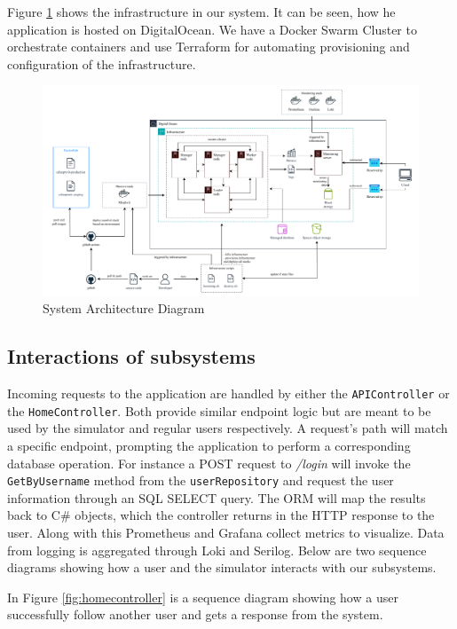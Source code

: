 Figure \ref{fig:architecture} shows the infrastructure in our system.
It can be seen, how he application is hosted on DigitalOcean. We have a Docker Swarm Cluster to orchestrate containers and use Terraform for automating provisioning and configuration of the infrastructure.

\begin{figure}[H]
    \centering
    \includegraphics[width=1.0\textwidth]{figures/devops-architecture-architecture_v2.pdf}
    \caption{System Architecture Diagram}
    \label{fig:architecture}
\end{figure}


\subsection{Interactions of subsystems}
\label{systems:interactions}
Incoming requests to the application are handled by either the \texttt{APIController} or the \texttt{HomeController}. Both provide similar endpoint logic but are meant to be used by the simulator and regular users respectively. A request's path will match a specific endpoint, prompting the application to perform a corresponding database operation. For instance a POST request to \textit{/login} will invoke the \texttt{GetByUsername} method from the \texttt{userRepository} and request the user information through an SQL SELECT query. The ORM will map the results back to C\# objects, which the controller returns in the HTTP response to the user. 
Along with this Prometheus and Grafana collect metrics to visualize. Data from logging is aggregated through Loki and Serilog. Below are two sequence diagrams showing how a user and the simulator interacts with our subsystems.\newline

\noindent In Figure \ref{fig:homecontroller} is a sequence diagram showing how a user successfully follow another user and gets a response from the system.\newline

